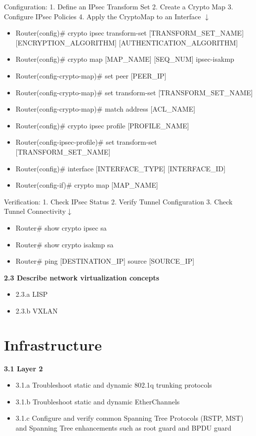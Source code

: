 \documentclass{article}
\begin{document}
Configuration: 1. Define an IPsec Transform Set 2. Create a Crypto Map 3. Configure IPsec Policies 4. Apply the CryptoMap to an Interface $\downarrow$
\begin{itemize}
\item Router(config)\# crypto ipsec transform-set [TRANSFORM\_SET\_NAME] [ENCRYPTION\_ALGORITHM] [AUTHENTICATION\_ALGORITHM]
\item Router(config)\# crypto map [MAP\_NAME] [SEQ\_NUM] ipsec-isakmp
\item Router(config-crypto-map)\# set peer [PEER\_IP]
\item Router(config-crypto-map)\# set transform-set [TRANSFORM\_SET\_NAME]
\item Router(config-crypto-map)\# match address [ACL\_NAME]
\item Router(config)\# crypto ipsec profile [PROFILE\_NAME]
\item Router(config-ipsec-profile)\# set transform-set [TRANSFORM\_SET\_NAME]
\item Router(config)\# interface [INTERFACE\_TYPE] [INTERFACE\_ID]
\item Router(config-if)\# crypto map [MAP\_NAME]
\end{itemize}

Verification: 1. Check IPsec Status 2. Verify Tunnel Configuration 3. Check Tunnel Connectivity$\downarrow$
\begin{itemize}
\item Router\# show crypto ipsec sa
\item Router\# show crypto isakmp sa
\item Router\# ping [DESTINATION\_IP] source [SOURCE\_IP]
\end{itemize}

\textbf{2.3 Describe network virtualization concepts}
\begin{itemize}
\item 2.3.a LISP
\item 2.3.b VXLAN
\end{itemize}

\section{Infrastructure}
\textbf{3.1 Layer 2}
\begin{itemize}
\item 3.1.a Troubleshoot static and dynamic 802.1q trunking protocols
\item 3.1.b Troubleshoot static and dynamic EtherChannels
\item 3.1.c Configure and verify common Spanning Tree Protocols (RSTP, MST) and Spanning Tree enhancements such as root guard and BPDU guard
\end{itemize}
\end{document}
